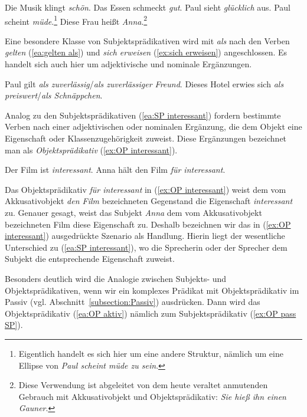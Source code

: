 \ea \label{ea:SP ohne Kopula}
\ea \label{ea:klingen} Die Musik klingt \textit{schön}.
\ex \label{ex:schmecken} Das Essen schmeckt \textit{gut}.
\ex \label{ex:aussehen} Paul sieht \textit{glücklich} aus.
\ex \label{ex:scheinen} Paul scheint \textit{müde}.\footnote{Eigentlich handelt es sich hier um eine andere Struktur, nämlich um eine Ellipse von \textit{Paul scheint müde zu sein}.}
\ex \label{ex:heißen} Diese Frau heißt \textit{Anna}.\footnote{Diese Verwendung ist abgeleitet von dem heute veraltet anmutenden Gebrauch mit Akkusativobjekt und Objektsprädikativ: \textit{Sie hieß ihn einen Gauner}.}
\z 
\z 

Eine besondere Klasse von Subjektsprädikativen wird mit \textit{als} nach den Verben \textit{gelten} (\ref{ea:gelten als}) und \textit{sich erweisen} (\ref{ex:sich erweisen}) angeschlossen. Es handelt sich auch hier um adjektivische und nominale Ergänzungen.

\ea \label{ea:als SP}
\ea \label{ea:gelten als} Paul gilt \textit{als zuverlässig}/\textit{als zuverlässiger Freund}.
\ex \label{ex:sich erweisen} Dieses Hotel erwies sich \textit{als preiswert}/\textit{als Schnäppchen}. 
\z 
\z 

Analog zu den Subjektsprädikativen (\ref{ea:SP interessant}) fordern bestimmte Verben nach einer adjektivischen oder nominalen Ergänzung, die dem Objekt eine Eigenschaft oder Klassenzugehörigkeit zuweist. Diese Ergänzungen bezeichnet man als \textit{Objektsprädikativ} (\ref{ex:OP interessant}). 

\ea \label{ea:SP vs. OP}
\ea \label{ea:SP interessant} Der Film ist \textit{interessant}.
\ex \label{ex:OP interessant} Anna hält den Film \textit{für interessant}.
\z 
\z 

Das Objektsprädikativ \textit{für interessant} in (\ref{ex:OP interessant}) weist dem vom Akkusativobjekt \textit{den Film} bezeichneten Gegenstand die Eigenschaft \textit{interessant} zu. Genauer gesagt, weist das Subjekt \textit{Anna} dem vom Akkusativobjekt bezeichneten Film diese Eigenschaft zu. Deshalb bezeichnen wir das in (\ref{ex:OP interessant}) ausgedrückte Szenario als Handlung. Hierin liegt der wesentliche Unterschied zu (\ref{ea:SP interessant}), wo die Sprecherin oder der Sprecher dem Subjekt die entsprechende Eigenschaft zuweist. 


Besonders deutlich wird die Analogie zwischen Subjekts- und Objektsprädikativen, wenn wir ein komplexes Prädikat mit Objektsprädikativ im Passiv (vgl. Abschnitt~\ref{subsection:Passiv}) ausdrücken. Dann wird das Objektsprädikativ (\ref{ea:OP aktiv}) nämlich zum Subjektsprädikativ (\ref{ex:OP pass SP}).

